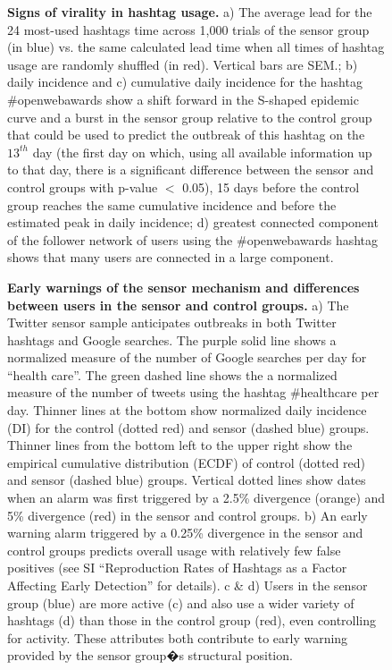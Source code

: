 \begin{figure}[ht]
\begin{center}
\end{center}
\caption{
{\bf Signs of virality in hashtag usage.}  a) The average lead for the 24 most-used hashtags time across 1,000 trials of the sensor group (in blue) vs. the same calculated lead time when all times of hashtag usage are randomly shuffled (in red).  Vertical bars are SEM.; b) daily incidence and c) cumulative daily incidence for the hashtag \#openwebawards show a shift forward in the S-shaped epidemic curve and a burst in the sensor group relative to the control group that could be used to predict the outbreak of this hashtag on the $13^{th}$ day (the first day on which, using all available information up to that day, there is a significant difference between the sensor and control groups with p-value $<$ 0.05), 15 days before the control group reaches the same cumulative incidence and before the estimated peak in daily incidence; d) greatest connected component of the follower network of users using the \#openwebawards hashtag shows that many users are connected in a large component.
}
\label{panel3}
\end{figure}

\begin{figure}[ht]
\begin{center}
\end{center}
\caption{
{\bf Early warnings of the sensor mechanism and differences between users in the sensor and control groups.} a) The Twitter sensor sample anticipates outbreaks in both Twitter hashtags and Google searches.  The purple solid line shows a normalized measure of the number of Google searches per day for ``health care''.  The green dashed line shows the a normalized measure of the number of tweets using the hashtag \#healthcare per day.  Thinner lines at the bottom show normalized daily incidence (DI) for the control (dotted red) and sensor (dashed blue) groups.  Thinner lines from the bottom left to the upper right show the empirical cumulative distribution (ECDF) of control (dotted red) and sensor (dashed blue) groups.  Vertical dotted lines show dates when an alarm was first triggered by a 2.5\% divergence (orange) and 5\% divergence (red) in the sensor and control groups. b) An early warning alarm triggered by a 0.25\% divergence in the sensor and control groups predicts overall usage with relatively few false positives (see SI ``Reproduction Rates of Hashtags as a Factor Affecting Early Detection'' for details).  c \& d) Users in the sensor group (blue) are more active (c) and also use a wider variety of hashtags (d) than those in the control group (red), even controlling for activity.  These attributes both contribute to early warning provided by the sensor group�s structural position.
}
\label{panel4}
\end{figure}


